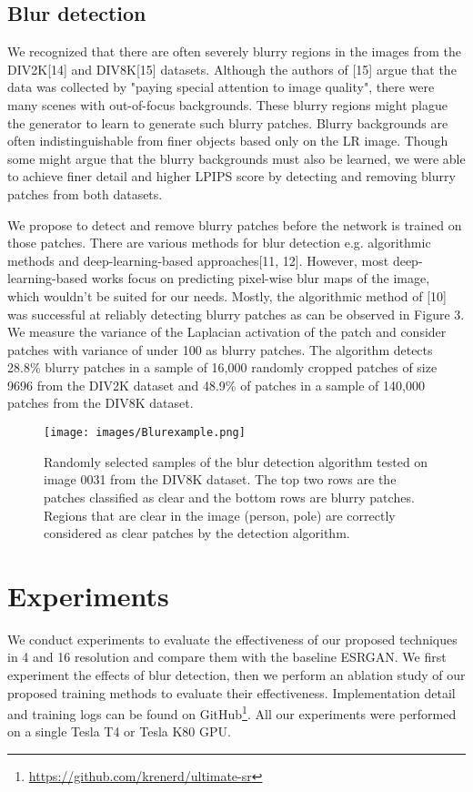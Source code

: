 \documentclass{article}
\begin{document}
\subsection{Blur detection}

We recognized that there are often severely blurry regions in the images from the DIV2K[14] and DIV8K[15] datasets. Although the authors of [15] argue that the data was collected by "paying special attention to image quality", there were many scenes with out-of-focus backgrounds. These blurry regions might plague the generator to learn to generate such blurry patches. Blurry backgrounds are often indistinguishable from finer objects based only on the LR image. Though some might argue that the blurry backgrounds must also be learned, we were able to achieve finer detail and higher LPIPS score by detecting and removing blurry patches from both datasets. 

We propose to detect and remove blurry patches before the network is trained on those patches. There are various methods for blur detection e.g. algorithmic methods and deep-learning-based approaches[11, 12]. However, most deep-learning-based works focus on predicting pixel-wise blur maps of the image, which wouldn't be suited for our needs. Mostly, the algorithmic method of [10] was successful at reliably detecting blurry patches as can be observed in Figure 3. We measure the variance of the Laplacian activation of the patch and consider patches with variance of under 100 as blurry patches. The algorithm detects 28.8\% blurry patches in a sample of 16,000 randomly cropped patches of size 9696 from the DIV2K dataset and 48.9\% of patches in a sample of 140,000 patches from the DIV8K dataset.

\begin{figure}
  \centering
  \texttt{[image: images/Blurexample.png]}
  \caption{Randomly selected samples of the blur detection algorithm tested on image 0031 from the DIV8K dataset. The top two rows are the patches classified as clear and the bottom rows are blurry patches. Regions that are clear in the image (person, pole) are correctly considered as clear patches by the detection algorithm.}
\end{figure}


\section{Experiments}

We conduct experiments to evaluate the effectiveness of our proposed techniques in 4 and 16 resolution and compare them with the baseline ESRGAN. We first experiment the effects of blur detection, then we perform an ablation study of our proposed training methods to evaluate their effectiveness. Implementation detail and training logs can be found on GitHub\footnote{\url{https://github.com/krenerd/ultimate-sr}}. All our experiments were performed on a single Tesla T4 or Tesla K80 GPU. 
\end{document}
